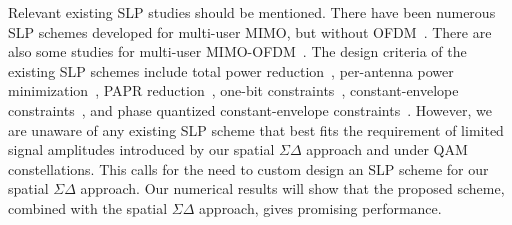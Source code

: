 \documentclass[10pt,twocolumn,twoside]{IEEEtran}
\begin{document}
Relevant existing SLP studies should be mentioned.
There have been numerous SLP schemes developed for multi-user MIMO, but without OFDM~\cite{spano2017symbol, mohammed2013per,pan2014constant,shao2019framework, masouros2015exploiting,alodeh2015constructive,alodeh2017symbol,liu2021symbol,jacobsson2017quantized,sohrabi2018one}.
There are also some studies for multi-user MIMO-OFDM~\cite{studer2013aware,bao2016efficient,yao2018semidefinite,qin2021low,askerbeyli20191,domouchtsidis2020constant,jacobsson2018nonlinear,tsinos2020symbol}.
The design criteria of the existing SLP schemes include
total power reduction~\cite{masouros2015exploiting,alodeh2015constructive,alodeh2017symbol,liu2021symbol},
per-antenna power minimization~\cite{spano2017symbol,liu2021symbol},
PAPR reduction~\cite{studer2013aware,bao2016efficient,yao2018semidefinite,qin2021low},
one-bit constraints~\cite{jacobsson2017quantized,sohrabi2018one,askerbeyli20191,shao2019framework},
constant-envelope constraints~\cite{mohammed2013per,pan2014constant,shao2019framework,domouchtsidis2020constant},
and phase quantized constant-envelope constraints~\cite{jacobsson2018nonlinear,tsinos2020symbol,shao2019framework}.
However, we are unaware of any existing SLP scheme that best fits the requirement of limited signal amplitudes introduced by our spatial $\Sigma \Delta$ approach and under QAM constellations.
This calls for the need to custom design an SLP scheme for our spatial $\Sigma \Delta$ approach.
Our numerical results will show that the proposed scheme, combined with the spatial $\Sigma \Delta$ approach, gives promising performance.
\end{document}
